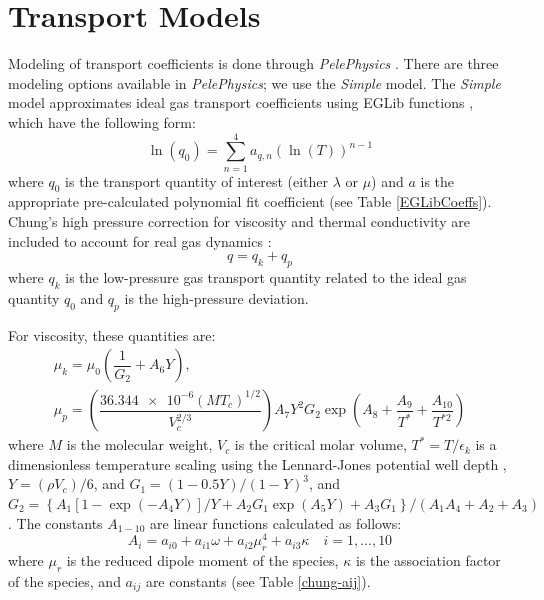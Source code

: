 \section{Transport Models}
Modeling of transport coefficients is done through \textit{PelePhysics} \cite{PelePhysics}. There are three modeling options available in \textit{PelePhysics}; we use the \textit{Simple} model. The \textit{Simple} model approximates ideal gas transport coefficients using EGLib functions \cite{ERN1995105}, which have the following form:
\begin{equation} \label{EGLib}
\ln{(q_0)} = \sum\limits_{n=1}^{4} a_{q,n}\left( \ln{(T)}\right)^{n-1}
\end{equation}
where $q_0$ is the transport quantity of interest (either $\lambda$ or $\mu$) and $a$ is the appropriate pre-calculated polynomial fit coefficient (see Table \ref{EGLibCoeffs}). Chung's high pressure correction for viscosity and thermal conductivity are included to account for real gas dynamics \cite{chung:1988}: 
\begin{equation} \label{chung_general}
q = q_k + q_p
\end{equation}
where $q_k$ is the low-pressure gas transport quantity related to the ideal gas quantity $q_0$ and $q_p$ is the high-pressure deviation. 

For viscosity, these quantities are:
\begin{equation}
\begin{split}
\mu_k = \mu_0 \left( \dfrac{1}{G_2} + A_6 Y \right), \\ 
\mu_p = \left(\dfrac{\num{36.344e-6}(MT_c)^{1/2}}{V_c^{2/3}}\right)A_7Y^2G_2\exp(A_8 + \dfrac{A_9}{T^*} + \dfrac{A_{10}}{T^{*2}}) 
\end{split}
\end{equation}
where $M$ is the molecular weight, $V_c$ is the critical molar volume, $T^* = T/\epsilon_k$ is a dimensionless temperature scaling using the Lennard-Jones potential well depth \cite{}, $Y = (\rho V_c)/6$, and $G_1 = (1-0.5Y)/(1-Y)^3$, and $G_2 = \left\{A_1\left[   1-\exp(-A_4Y)\right]/Y + A_2G_1\exp(A_5Y) + A_3G_1 \right\}/(A_1A_4 + A_2 + A_3)$. The constants $A_{1-10}$ are linear functions calculated as follows: 
\begin{equation}
A_i = a_{i0} + a_{i1} \omega + a_{i2} \mu_r^4 + a_{i3} \kappa \quad i = 1,..., 10
\end{equation} 
where $\mu_r$ is the reduced dipole moment of the species, $\kappa$ is the association factor of the species, and $a_{ij}$ are constants (see Table \ref{chung-aij}).  


